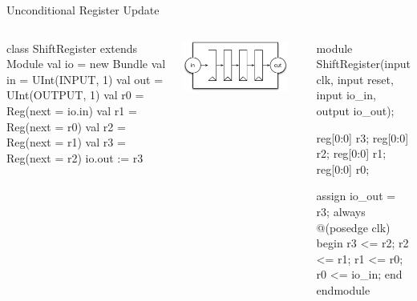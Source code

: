 \documentclass[xcolor=pdflatex,dvipsnames,table]{beamer}
\begin{document}
\begin{frame}[fragile]{Unconditional Register Update}

\begin{columns}


{
\begin{scala}
class ShiftRegister extends Module {
  val io = new Bundle {
    val in  = UInt(INPUT, 1)
    val out = UInt(OUTPUT, 1)
  }
  val r0 = Reg(next = io.in)
  val r1 = Reg(next = r0)
  val r2 = Reg(next = r1)
  val r3 = Reg(next = r2)
  io.out := r3
}
\end{scala}
}
\begin{center}
\includegraphics[width=0.9\textwidth]{figs/shift-register.pdf}
\end{center}


{
\begin{scala}
module ShiftRegister(input clk, input reset,
    input  io_in,
    output io_out);

  reg[0:0] r3;
  reg[0:0] r2;
  reg[0:0] r1;
  reg[0:0] r0;

  assign io_out = r3;
  always @(posedge clk) begin
    r3 <= r2;
    r2 <= r1;
    r1 <= r0;
    r0 <= io_in;
  end
endmodule
\end{scala}
}

\end{columns}

\end{frame}
\end{document}
